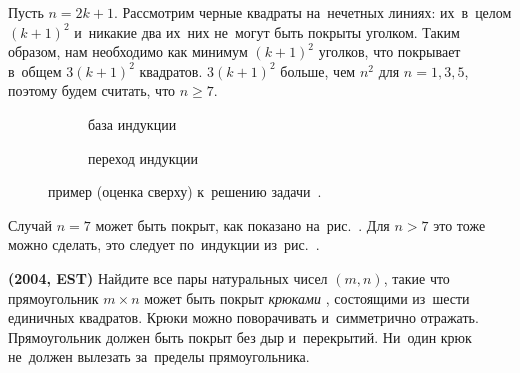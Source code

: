 \ifincludesolutions
Пусть $n = 2 k + 1$.
Рассмотрим черные квадраты на~нечетных линиях: их~в~целом $(k + 1)^2$ и~никакие
два их~них не~могут быть покрыты уголком.
Таким образом, нам необходимо как минимум $(k + 1)^2$ уголков, что покрывает
в~общем $3 (k + 1)^2$ квадратов.
$3 (k + 1)^2$ больше, чем $n^2$ для $n = 1, 3, 5$, поэтому будем считать, что
$n \geq 7$.
\begin{figure}[ht]\begin{center}
\strut\hfill
    \begin{subfigure}{3.5cm}
    \caption{база индукции}
    \end{subfigure}
\hfill
    \begin{subfigure}{4.5cm}
    \caption{переход индукции}
    \end{subfigure}
\hfill\strut\par
\caption{пример (оценка сверху)
к~решению задачи~.}%
\end{center}\end{figure}
\par
Случай $n = 7$ может быть покрыт, как показано
на~рис.~.
Для $n > 7$ это тоже можно сделать, это следует по~индукции
из~рис.~.
\fi %

\begin{problems}

\item\textbf{(2004, EST)}%
Найдите все пары натуральных чисел $(m, n)$, такие что прямоугольник
$m \times n$ может быть покрыт
\emph{крюками}
,
состоящими из~шести единичных квадратов.
Крюки можно поворачивать и~симметрично отражать.
Прямоугольник должен быть покрыт без дыр и~перекрытий.
Ни~один крюк не~должен вылезать за~пределы прямоугольника.

\end{problems}

